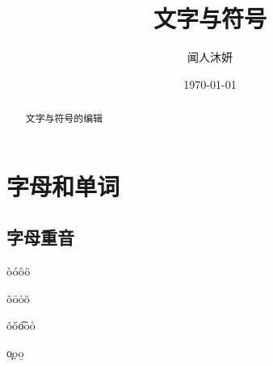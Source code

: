 \documentclass[UTF8]{ctexart}
\title{文字与符号}
\author{闻人沐妍}
\date{\today}
\begin{document}
    \maketitle

    \begin{abstract}
        文字与符号的编辑
    \end{abstract}

    \tableofcontents

    \section{字母和单词}
        \subsection{字母重音}
            \`o\phantom{50}\'o\phantom{50}\^o\phantom{50}\"o
            
            \~o\phantom{50}\=o\phantom{50}\.o\phantom{50}\u{o}

            \v{o}\phantom{50}\H{o}\phantom{50}\t{oo}\phantom{50}\r{o}

            \c{o}\phantom{50}\d{o}\phantom{50}\b{o}
\end{document}
